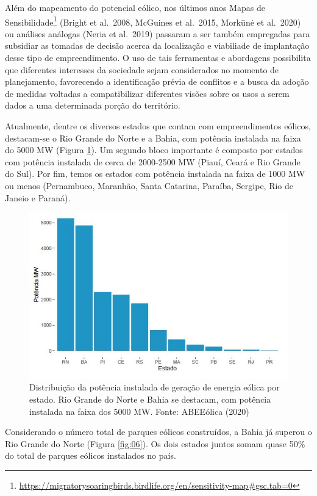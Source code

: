 \documentclass[
  oneside]{scrbook}
\DeclareRobustCommand{\href}[2]{#2\footnote{\url{#1}}}
\begin{document}
Além do mapeamento do potencial eólico, nos últimos anos \href{https://migratorysoaringbirds.birdlife.org/en/sensitivity-map\#gsc.tab=0}{Mapas de Sensibilidade} (Bright et al.~2008, McGuines et al.~2015, Morkūnė et al.~2020) ou análises análogas (Neria et al.~2019) passaram a ser também empregadas para subsidiar as tomadas de decisão acerca da localização e viabiliade de implantação desse tipo de empreendimento. O uso de tais ferramentas e abordagens possibilita que diferentes interesses da sociedade sejam considerados no momento de planejamento, favorecendo a identificação prévia de conflitos e a busca da adoção de medidas voltadas a compatibilizar diferentes visões sobre os usos a serem dados a uma determinada porção do território.

Atualmente, dentre os diversos estados que contam com empreendimentos eólicos, destacam-se o Rio Grande do Norte e a Bahia, com potência instalada na faixa do 5000 MW (Figura \ref{fig:05}). Um segundo bloco importante é composto por estados com potência instalada de cerca de 2000-2500 MW (Piauí, Ceará e Rio Grande do Sul). Por fim, temos os estados com potência instalada na faixa de 1000 MW ou menos (Pernambuco, Maranhão, Santa Catarina, Paraíba, Sergipe, Rio de Janeio e Paraná).

\begin{figure}[H]

{\centering \includegraphics[width=0.65\linewidth]{imagens/cap01/Figura_1.5} 

}

\caption{Distribuição da potência instalada de geração de energia eólica por estado. Rio Grande do Norte e Bahia se destacam, com potência instalada na faixa dos 5000 MW. Fonte: ABEEólica (2020)}\label{fig:05}
\end{figure}

Considerando o número total de parques eólicos construídos, a Bahia já superou o Rio Grande do Norte (Figura \ref{fig:06}). Os dois estados juntos somam quase 50\% do total de parques eólicos instalados no país.
\end{document}
